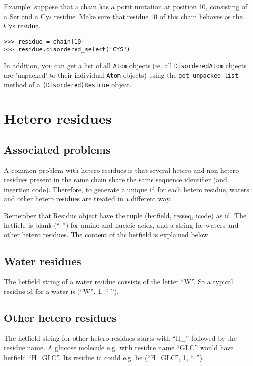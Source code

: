 Example: suppose that a chain has a point mutation at position 10,
consisting of a Ser and a Cys residue. Make sure that residue 10 of
this chain behaves as the Cys residue.
\begin{verbatim}
>>> residue = chain[10]
>>> residue.disordered_select('CYS')
\end{verbatim}
In addition, you can get a list of all \texttt{Atom} objects (ie.
all \texttt{DisorderedAtom} objects are 'unpacked' to their individual
\texttt{Atom} objects) using the \texttt{get\_unpacked\_list} method
of a \texttt{(Disordered)\-Residue} object.

\section{Hetero residues}

\subsection{Associated problems\label{hetero problems}}

A common problem with hetero residues is that several hetero and non-hetero
residues present in the same chain share the same sequence identifier (and insertion
code). Therefore, to generate a unique id for each hetero residue, waters and
other hetero residues are treated in a different way.

Remember that Residue object have the tuple (hetfield, resseq, icode) as id.
The hetfield is blank (`` '') for amino and nucleic acids, and a string
for waters and other hetero residues. The content of the hetfield is explained
below.

\subsection{Water residues}

The hetfield string of a water residue consists of the letter ``W''. So
a typical residue id for a water is (``W'', 1, `` '').

\subsection{Other hetero residues}

The hetfield string for other hetero residues starts with ``H\_'' followed
by the residue name. A glucose molecule e.g. with residue name ``GLC''
would have hetfield ``H\_GLC''. Its residue id could e.g. be (``H\_GLC'',
1, `` '').

